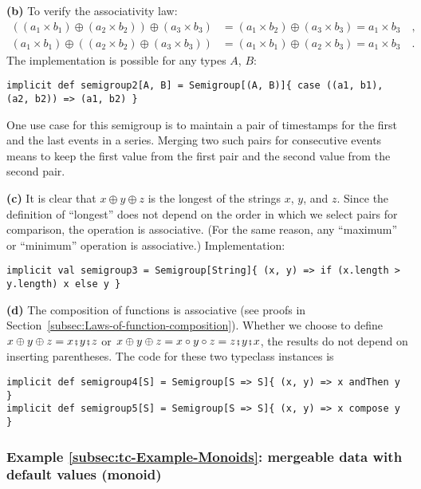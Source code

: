 \textbf{(b)} To verify the associativity law:
\begin{align*}
\left(\left(a_{1}\times b_{1}\right)\oplus\left(a_{2}\times b_{2}\right)\right)\oplus\left(a_{3}\times b_{3}\right) & =\left(a_{1}\times b_{2}\right)\oplus\left(a_{3}\times b_{3}\right)=a_{1}\times b_{3}\quad,\\
\left(a_{1}\times b_{1}\right)\oplus\left(\left(a_{2}\times b_{2}\right)\oplus\left(a_{3}\times b_{3}\right)\right) & =\left(a_{1}\times b_{1}\right)\oplus\left(a_{2}\times b_{3}\right)=a_{1}\times b_{3}\quad.
\end{align*}
The implementation is possible for any types $A$, $B$:
\begin{lstlisting}
implicit def semigroup2[A, B] = Semigroup[(A, B)]{ case ((a1, b1), (a2, b2)) => (a1, b2) }
\end{lstlisting}

One use case for this semigroup is to maintain a pair of timestamps
for the first and the last events in a series. Merging two such pairs
for consecutive events means to keep the first value from the first
pair and the second value from the second pair.

\textbf{(c)} It is clear that $x\oplus y\oplus z$ is the longest
of the strings $x$, $y$, and $z$. Since the definition of ``longest''
does not depend on the order in which we select pairs for comparison,
the operation is associative. (For the same reason, any ``maximum''
or ``minimum'' operation is associative.) Implementation:
\begin{lstlisting}
implicit val semigroup3 = Semigroup[String]{ (x, y) => if (x.length > y.length) x else y }
\end{lstlisting}

\textbf{(d)} The composition of functions is associative (see proofs
in Section~\ref{subsec:Laws-of-function-composition}). Whether we
choose to define $x\oplus y\oplus z=x\bef y\bef z$ or $x\oplus y\oplus z=x\circ y\circ z=z\bef y\bef x$,
the results do not depend on inserting parentheses. The code for these
two typeclass instances is
\begin{lstlisting}
implicit def semigroup4[S] = Semigroup[S => S]{ (x, y) => x andThen y }
implicit def semigroup5[S] = Semigroup[S => S]{ (x, y) => x compose y }
\end{lstlisting}


\subsubsection{Example \label{subsec:tc-Example-Monoids}\ref{subsec:tc-Example-Monoids}:
mergeable data with default values (monoid)}

